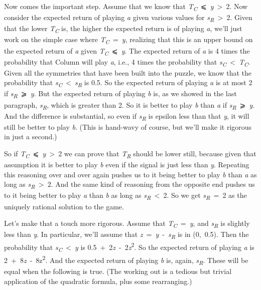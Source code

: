 \documentclass[
  10pt,
  letterpaper,
  DIV=11,
  numbers=noendperiod,
  twoside]{scrartcl}
\begin{document}
Now comes the important step. Assume that we know that
\emph{T\textsubscript{C}}~⩽~\emph{y}~\textgreater~2. Now consider the
expected return of playing \emph{a} given various values for
\emph{s\textsubscript{R}}~\textgreater~2. Given that the lower
\emph{T\textsubscript{C}} is, the higher the expected return is of
playing \emph{a}, we'll just work on the simple case where
\emph{T\textsubscript{C}}~=~\emph{y}, realizing that this is an upper
bound on the expected return of \emph{a} given
\emph{T\textsubscript{C}}~⩽~\emph{y}. The expected return of \emph{a} is
4 times the probability that Column will play \emph{a}, i.e., 4 times
the probability that
\emph{s\textsubscript{C}}~\textless~\emph{T\textsubscript{C}}. Given all
the symmetries that have been built into the puzzle, we know that the
probability that
\emph{s\textsubscript{C}}~\textless~\emph{s\textsubscript{R}} is 0.5. So
the expected return of playing \emph{a} is at most 2 if
\emph{s\textsubscript{R}}~⩾~\emph{y}. But the expected return of playing
\emph{b} is, as we showed in the last paragraph,
\emph{s\textsubscript{R}}, which is greater than 2. So it is better to
play \emph{b} than \emph{a} if \emph{s\textsubscript{R}}~⩾~\emph{y}. And
the difference is substantial, so even if \emph{s\textsubscript{R}} is
epsilon less than that \emph{y}, it will still be better to play
\emph{b}. (This is hand-wavy of course, but we'll make it rigorous in
just a second.)

So if \emph{T\textsubscript{C}}~⩽~\emph{y}~\textgreater~2 we can prove
that \emph{T\textsubscript{R}} should be lower still, because given that
assumption it is better to play \emph{b} even if the signal is just less
than \emph{y}. Repeating this reasoning over and over again pushes us to
it being better to play \emph{b} than \emph{a} as long as
\emph{s\textsubscript{R}}~\textgreater~2. And the same kind of reasoning
from the opposite end pushes us to it being better to play \emph{a} than
\emph{b} as long as \emph{s\textsubscript{R}}~\textless~2. So we get
\emph{s\textsubscript{R}}~=~2 as the uniquely rational solution to the
game.

Let's make that a touch more rigorous. Assume that
\emph{T\textsubscript{C}}~=~\emph{y}, and \emph{s\textsubscript{R}} is
slightly less than \emph{y}. In particular, we'll assume that
\emph{z}~=~\emph{y}~-~\emph{s\textsubscript{R}} is in (0,~0.5). Then the
probability that \emph{s\textsubscript{C}}~\textless~\emph{y} is
0.5~+~2\emph{z}~-~2\emph{z}\textsuperscript{2}. So the expected return
of playing \emph{a} is 2~+~8\emph{z}~-~8z\textsuperscript{2}. And the
expected return of playing \emph{b} is, again,
\emph{s\textsubscript{R}}. These will be equal when the following is
true. (The working out is a tedious but trivial application of the
quadratic formula, plus some rearranging.)
\end{document}
